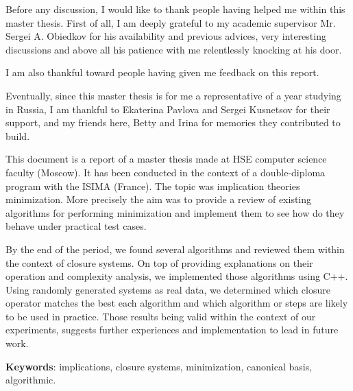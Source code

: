 \documentclass[a4paper]{report}
\begin{document}
	

	



Before any discussion, I would like to thank people having helped me within this master thesis. First of all, I am deeply grateful to my academic supervisor Mr. Sergei A. Obiedkov for his availability and previous advices, very interesting discussions and above all his patience with me relentlessly knocking at his door.

I am also thankful toward people having given me feedback on this report.

Eventually, since this master thesis is for me a representative of a year studying in Russia, I am thankful to Ekaterina Pavlova and Sergei Kusnetsov for their support, and my friends here, Betty and Irina for memories they contributed to build.

\newpage
\listoffigures
\newpage

\newpage
\listoftables
\newpage

\newpage
\listofalgorithms
\newpage



This document is a report of a master thesis made at HSE computer science faculty (Moscow). It has been conducted in the context of a double-diploma program with the ISIMA (France). The topic was implication theories minimization. More precisely the aim was to provide a review of existing algorithms for performing minimization and implement them to see how do
they behave under practical test cases.

\vspace{1.2em}

By the end of the period, we found several algorithms and reviewed them within the context of closure systems. On top of providing explanations on their operation and complexity analysis, we implemented those algorithms using C++.
Using randomly generated systems as real data, we determined which closure operator matches the best each algorithm and which algorithm or steps are likely to be used in practice. Those results being valid within the context
of our experiments, suggests further experiences and implementation to lead in future work.

\vspace{1.2em}

\textbf{Keywords}: implications, closure systems, minimization, canonical basis, algorithmic.
\end{document}

